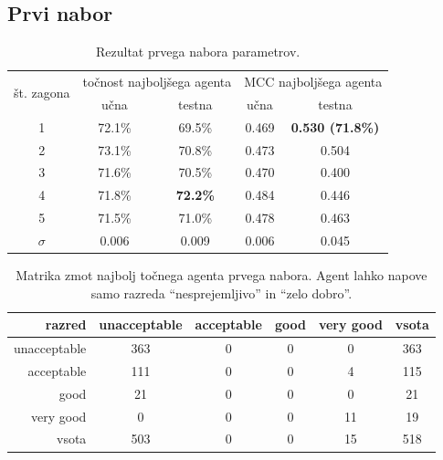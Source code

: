 \subsection{Prvi nabor}\label{subsec:dodatek-car-prvi-nabor}
\begin{table}[H]
    \begin{center}
        \begin{tabular}{|| c | c c || c c ||}
            \hline
            \multirow{2}{*}{št. zagona} & \multicolumn{2}{c||}{točnost najboljšega agenta} & \multicolumn{2}{c||}{MCC najboljšega agenta} \\ \cline{2-5}
            & učna   & testna          & učna  & testna                  \\
            \hline
            1        & 72.1\% & 69.5\%          & 0.469 & \textbf{0.530 (71.8\%)} \\
            \hline
            2        & 73.1\% & 70.8\%          & 0.473 & 0.504                   \\
            \hline
            3        & 71.6\% & 70.5\%          & 0.470 & 0.400                   \\
            \hline
            4        & 71.8\% & \textbf{72.2\%} & 0.484 & 0.446                   \\
            \hline
            5        & 71.5\% & 71.0\%          & 0.478 & 0.463                   \\
            \hline
            $\sigma$ & 0.006  & 0.009           & 0.006 & 0.045                   \\
            \hline
        \end{tabular}
    \end{center}
    \caption{Rezultat prvega nabora parametrov.}
    \label{tab:car_result_1}
\end{table}

\begin{table}[H]
    \centering
    \begin{tabular}{||rccccc||}
        \hline
        razred       & unacceptable & acceptable & good & very good & vsota \\ \hline
        unacceptable & 363          & 0          & 0    & 0         & 363   \\ \hline
        acceptable   & 111          & 0          & 0    & 4         & 115   \\ \hline
        good         & 21           & 0          & 0    & 0         & 21    \\ \hline
        very good    & 0            & 0          & 0    & 11        & 19    \\ \hline
        vsota        & 503          & 0          & 0    & 15        & 518   \\ \hline
    \end{tabular}
    \caption{Matrika zmot najbolj točnega agenta prvega nabora. Agent lahko napove samo razreda \enquote{nesprejemljivo} in \enquote{zelo dobro}.}
    \label{tab:car_acc_1}
\end{table}

